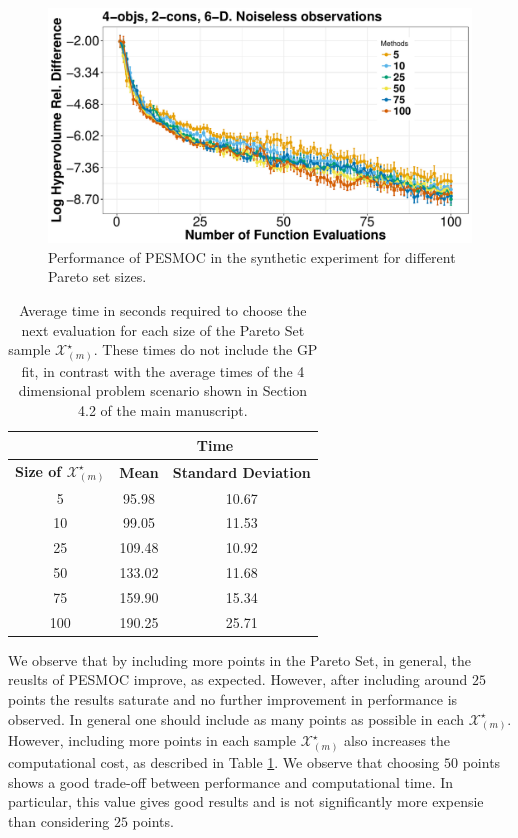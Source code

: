 \documentclass[review,preprint,12pt]{elsarticle}
\begin{document}
\begin{figure}[htb]
	\begin{center}
	\includegraphics[width=0.75\linewidth]{../figures/revision/plotParetoSensitivityAnalysis.pdf}
	\caption{Performance of PESMOC in the synthetic experiment for different Pareto set sizes.}
	\end{center}
        \label{fig:PESMOC_Size}
\end{figure}



\begin{table}[htb]
\centering
\caption{Average time in seconds required to choose 
the next evaluation for each size of the Pareto Set sample $\mathcal{X}_{(m)}^\star$. These times do not include the GP fit, in contrast with the average times of the 4 dimensional problem scenario shown in Section 4.2 of the main manuscript.}
{\small
\begin{tabular}{c | c | c}
 \hline
 & \multicolumn{2}{c}{{\bf Time}} \\
 \hline
 {\bf Size of $\mathcal{X}_{(m)} ^\star$} & {\bf Mean} & {\bf Standard Deviation} \\
 \hline
 5 & 95.98& 10.67\\
 10 & 99.05& 11.53\\
 25 & 109.48& 10.92\\
 50 & 133.02& 11.68\\
 75 & 159.90& 15.34\\
 100 & 190.25& 25.71\\
 \hline
\end{tabular}
}
\label{table:times_size}
\end{table}

We observe that by including more points in the Pareto Set, in general, the reuslts of PESMOC improve, as expected. 
However, after including around $25$ points the results saturate and no further improvement in performance is observed.
In general one should include as many points as possible in each $\mathcal{X}_{(m)}^\star$. However, including more points in each 
sample $\mathcal{X}_{(m) }^\star$ also increases the computational cost, as described in Table \ref{table:times_size}. We observe that choosing $50$ 
points shows a good trade-off between performance and computational time. In particular, this value gives good results and
is not significantly more expensie than considering $25$ points.
\end{document}
